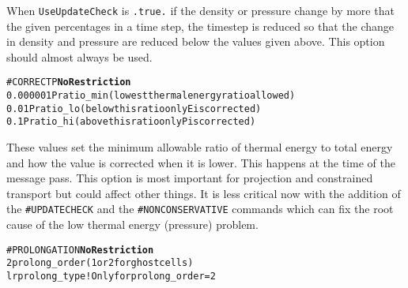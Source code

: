 When {\tt UseUpdateCheck} is {\tt .true.} if the density or pressure
change by more that the given percentages in a time step, the timestep 
is reduced so that the change in density and pressure are reduced below the
values given above. This option should almost always be used.
\ \ \\

\begin{alltt}
#CORRECTP        \hfill    {\bf No Restriction}
0.000001               Pratio_min (lowest thermal energy ratio allowed)
0.01                   Pratio_lo  (below this ratio only E is corrected)
0.1                    Pratio_hi  (above this ratio only P is corrected)
\end{alltt}

These values set the minimum allowable ratio of thermal energy to total
energy and how the value is corrected when it is lower.  This happens at
the time of the message pass.  This option is most important for 
projection and constrained transport but could affect other things. It
is less critical now with the addition of the {\tt \#UPDATECHECK} and
the {\tt \#NONCONSERVATIVE} commands which can fix the root cause of
the low thermal energy (pressure) problem.
\ \ \\

\begin{alltt}
#PROLONGATION   \hfill  {\bf No Restriction}
2                      prolong_order (1 or 2 for ghost cells)
lr                     prolong_type  ! Only for prolong_order=2
\end{alltt}

